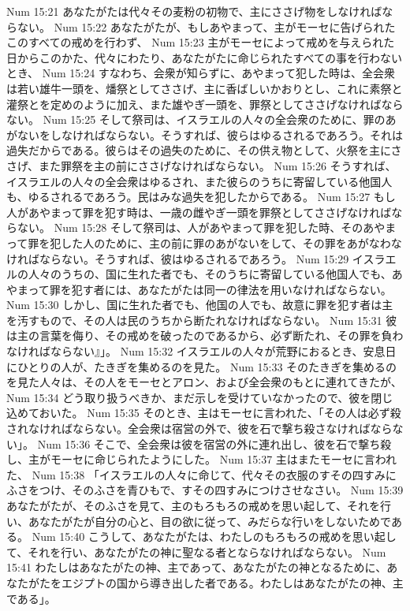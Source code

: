 Num 15:21  あなたがたは代々その麦粉の初物で、主にささげ物をしなければならない。
Num 15:22  あなたがたが、もしあやまって、主がモーセに告げられたこのすべての戒めを行わず、
Num 15:23  主がモーセによって戒めを与えられた日からこのかた、代々にわたり、あなたがたに命じられたすべての事を行わないとき、
Num 15:24  すなわち、会衆が知らずに、あやまって犯した時は、全会衆は若い雄牛一頭を、燔祭としてささげ、主に香ばしいかおりとし、これに素祭と灌祭とを定めのように加え、また雄やぎ一頭を、罪祭としてささげなければならない。
Num 15:25  そして祭司は、イスラエルの人々の全会衆のために、罪のあがないをしなければならない。そうすれば、彼らはゆるされるであろう。それは過失だからである。彼らはその過失のために、その供え物として、火祭を主にささげ、また罪祭を主の前にささげなければならない。
Num 15:26  そうすれば、イスラエルの人々の全会衆はゆるされ、また彼らのうちに寄留している他国人も、ゆるされるであろう。民はみな過失を犯したからである。
Num 15:27  もし人があやまって罪を犯す時は、一歳の雌やぎ一頭を罪祭としてささげなければならない。
Num 15:28  そして祭司は、人があやまって罪を犯した時、そのあやまって罪を犯した人のために、主の前に罪のあがないをして、その罪をあがなわなければならない。そうすれば、彼はゆるされるであろう。
Num 15:29  イスラエルの人々のうちの、国に生れた者でも、そのうちに寄留している他国人でも、あやまって罪を犯す者には、あなたがたは同一の律法を用いなければならない。
Num 15:30  しかし、国に生れた者でも、他国の人でも、故意に罪を犯す者は主を汚すもので、その人は民のうちから断たれなければならない。
Num 15:31  彼は主の言葉を侮り、その戒めを破ったのであるから、必ず断たれ、その罪を負わなければならない』」。
Num 15:32  イスラエルの人々が荒野におるとき、安息日にひとりの人が、たきぎを集めるのを見た。
Num 15:33  そのたきぎを集めるのを見た人々は、その人をモーセとアロン、および全会衆のもとに連れてきたが、
Num 15:34  どう取り扱うべきか、まだ示しを受けていなかったので、彼を閉じ込めておいた。
Num 15:35  そのとき、主はモーセに言われた、「その人は必ず殺されなければならない。全会衆は宿営の外で、彼を石で撃ち殺さなければならない」。
Num 15:36  そこで、全会衆は彼を宿営の外に連れ出し、彼を石で撃ち殺し、主がモーセに命じられたようにした。
Num 15:37  主はまたモーセに言われた、
Num 15:38  「イスラエルの人々に命じて、代々その衣服のすその四すみにふさをつけ、そのふさを青ひもで、すその四すみにつけさせなさい。
Num 15:39  あなたがたが、そのふさを見て、主のもろもろの戒めを思い起して、それを行い、あなたがたが自分の心と、目の欲に従って、みだらな行いをしないためである。
Num 15:40  こうして、あなたがたは、わたしのもろもろの戒めを思い起して、それを行い、あなたがたの神に聖なる者とならなければならない。
Num 15:41  わたしはあなたがたの神、主であって、あなたがたの神となるために、あなたがたをエジプトの国から導き出した者である。わたしはあなたがたの神、主である」。
